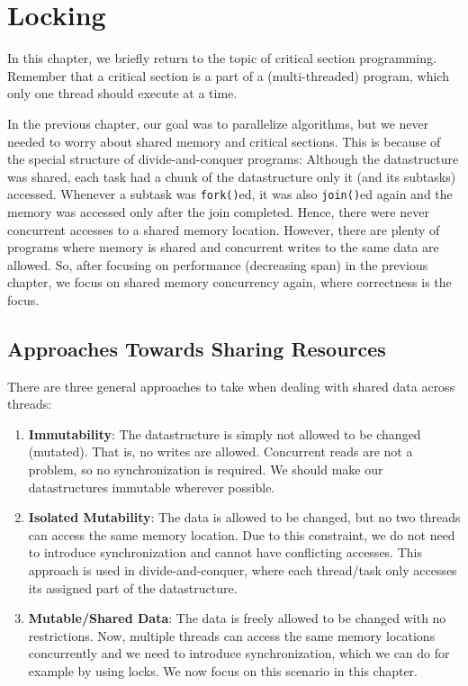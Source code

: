 \documentclass[main.tex]{subfiles}
\begin{document}
\addtolength{\tabcolsep}{-2pt}

\section{Locking}
In this chapter, we briefly return to the topic of critical section programming. Remember that a critical section is a part of a (multi-threaded) program, which only one thread should execute at a time.

In the previous chapter, our goal was to parallelize algorithms, but we never needed to worry about shared memory and critical sections. This is because of the special structure of divide-and-conquer programs: Although the datastructure was shared, each task had a chunk of the datastructure only it (and its subtasks) accessed. Whenever a subtask was \texttt{fork()}ed, it was also \texttt{join()}ed again and the memory was accessed only after the join completed. Hence, there were never concurrent accesses to a shared memory location. However, there are plenty of programs where memory is shared and concurrent writes to the same data are allowed. So, after focusing on performance (decreasing span) in the previous chapter, we focus on shared memory concurrency again, where correctness is the focus.

\subsection{Approaches Towards Sharing Resources}
There are three general approaches to take when dealing with shared data across threads:

\begin{enumerate}
  \item \textbf{Immutability}: The datastructure is simply not allowed to be changed (mutated). That is, no writes are allowed. Concurrent reads are not a problem, so no synchronization is required. We should make our datastructures immutable wherever possible.
  \item \textbf{Isolated Mutability}: The data is allowed to be changed, but no two threads can access the same memory location. Due to this constraint, we do not need to introduce synchronization and cannot have conflicting accesses. This approach is used in divide-and-conquer, where each thread/task only accesses its assigned part of the datastructure.
  \item \textbf{Mutable/Shared Data}: The data is freely allowed to be changed with no restrictions. Now, multiple threads can access the same memory locations concurrently and we need to introduce synchronization, which we can do for example by using locks. We now focus on this scenario in this chapter.
\end{enumerate}
\end{document}
